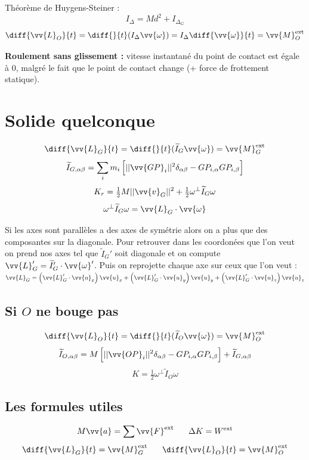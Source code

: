 \documentclass[landscape,a4paper]{article}
\newcommand{\req}[2]{
  \begin{center}
    \scalebox{#1}{
      \begin{tabular}{c}
        \(\displaystyle
        #2
        \)
      \end{tabular}
    }
  \end{center}
}
\newcommand{\F}{\ensuremath{\vv{F}}}
\newcommand{\vi}{\ensuremath{\vv{v}}}
\newcommand{\vian}{\ensuremath{\vv{\omega}}}
\newcommand{\ac}{\ensuremath{\vv{a}}}
\newcommand{\ux}{\ensuremath{\vv{u}_x}}
\newcommand{\uy}{\ensuremath{\vv{u}_y}}
\newcommand{\uz}{\ensuremath{\vv{u}_z}}
\newcommand{\mc}{\ensuremath{\vv{L}}}
\newcommand{\mf}{\ensuremath{\vv{M}}}
\newcommand{\exte}{\text{ext}}
\newcommand{\ti}{\ensuremath{\widetilde{I}}}
\begin{document}
\begin{multicols}{4}
  Théorème de Huygens-Steiner : 
  \[
    I_{\Delta} = Md^2 + I_{\Delta_G}
  \]
  \[
    \diff{\mc_O}{t} = \diff{}{t}(I_{\Delta}\vian) = I_{\Delta}\diff{\vian}{t}=\mf_O^{\exte}
  \]

  \textbf{Roulement sans glissement : } vitesse instantané du point de contact est égale à 0, malgré le fait que le point de contact change (+ force de frottement statique).

  \section{Solide quelconque}
  \req{1}{
    \delta_{\alpha\beta}=
    \begin{cases}
      0\phantom{tex}\text{si} \phantom{tex}\alpha\neq\beta\\
      1\phantom{tex}\text{si} \phantom{tex}\alpha=\beta\\
    \end{cases}
  }
  \[
    \diff{\mc_G}{t}=\diff{}{t}(\widetilde{I}_G\vian)=\mf_G^{\exte}
  \]
  \[
    \ti_{G,\alpha\beta}=\sum_im_i\left[||\vv{GP}_i||^2\delta_{\alpha\beta} - GP_{i,\alpha}GP_{i,\beta}\right]
  \]
  \[
    K_r = \tfrac{1}{2}M||\vi_G||^2 + \tfrac{1}{2}\omega^{\bot}\ti_G\omega
  \]
  \[
    \omega^{\bot}\ti_G\omega=\mc_G\cdot\vian
  \]

  Si les axes sont parallèles a des axes de symétrie alors on a plus que des composantes sur la diagonale. Pour retrouver dans les coordonées que l'on veut on prend nos axes tel que \(\ti_G'\) soit diagonale et on compute \(\mc_G'=\ti_G'\cdot\vian'\). Puis on reprojette chaque axe sur ceux que l'on veut : \(\mc_G=\left(\mc_G'\cdot\ux\right)\ux + \left(\mc_G'\cdot\uy\right)\uy + \left(\mc_G'\cdot\uz\right)\uz\)

  \subsection{Si \(O\) ne bouge pas}
  \[
    \diff{\mc_O}{t}=\diff{}{t}(\widetilde{I}_O\vian)=\mf_O^{\exte}
  \]
  \[
    \ti_{O,\alpha\beta}=M\left[||\vv{OP}_i||^2\delta_{\alpha\beta} - GP_{i,\alpha}GP_{i,\beta}\right] + \ti_{G,\alpha\beta}
  \]
  \[
    K =\tfrac{1}{2}\omega^{\bot}\ti_O\omega
  \]
  \subsection{Les formules utiles}
  \[
    M\ac = \sum\F^{\exte} \phantom{text} \Delta K = W^{\exte}
  \]
  \[
    \diff{\mc_G}{t}=\mf_G^{\exte} \phantom{text} \diff{\mc_O}{t}=\mf_O^{\exte}
  \]


\end{multicols}
\end{document}
